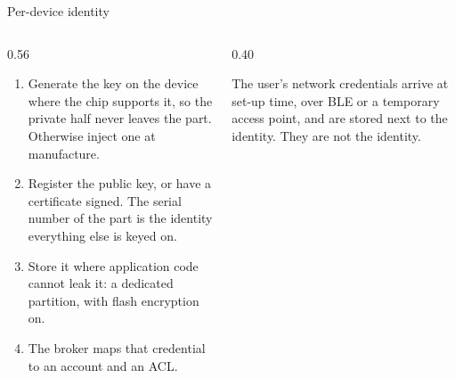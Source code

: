 \documentclass[10pt,aspectratio=169,t]{beamer}
\begin{document}
\begin{frame}[embedded,eyebrow=Trust]{Per-device identity}
  \vskip 2mm
  \begin{columns}[T]
    \begin{column}{0.56\textwidth}
      \begin{enumerate}
        \item Generate the key on the device where the chip supports it, so the private half never leaves the part. Otherwise inject one at manufacture.
        \item Register the public key, or have a certificate signed. The serial number of the part is the identity everything else is keyed on.
        \item Store it where application code cannot leak it: a dedicated partition, with flash encryption on.
        \item The broker maps that credential to an account and an ACL.
      \end{enumerate}
    \end{column}
    \begin{column}{0.40\textwidth}
      \begin{hint}[Wi-Fi is separate]
        The user's network credentials arrive at set-up time, over BLE or a temporary access point, and are stored next to the identity. They are not the identity.
      \end{hint}
    \end{column}
  \end{columns}
\end{frame}
\end{document}
